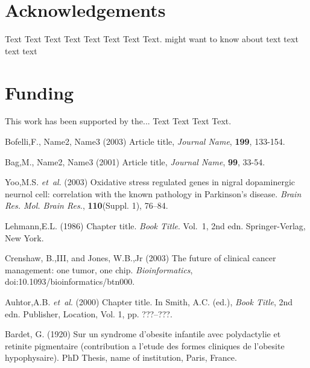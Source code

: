 \documentclass{bioinfo}
\begin{document}
\section*{Acknowledgements}

Text Text Text Text Text Text  Text Text.  \citealp{Boffelli03} might want to know about  text
text text text\vspace*{-12pt}

\section*{Funding}

This work has been supported by the... Text Text  Text Text.\vspace*{-12pt}

%
%
%
%
%
%
%
%
%


\begin{thebibliography}{}

Bofelli,F., Name2, Name3 (2003) Article title, {\it Journal Name}, {\bf 199}, 133-154.

Bag,M., Name2, Name3 (2001) Article title, {\it Journal Name}, {\bf 99}, 33-54.

Yoo,M.S. \textit{et~al}. (2003) Oxidative stress regulated genes
in nigral dopaminergic neurnol cell: correlation with the known
pathology in Parkinson's disease. \textit{Brain Res. Mol. Brain
Res.}, \textbf{110}(Suppl. 1), 76--84.

Lehmann,E.L. (1986) Chapter title. \textit{Book Title}. Vol.~1, 2nd edn. Springer-Verlag, New York.

Crenshaw, B.,III, and Jones, W.B.,Jr (2003) The future of clinical
cancer management: one tumor, one chip. \textit{Bioinformatics},
doi:10.1093/bioinformatics/btn000.

Auhtor,A.B. \textit{et~al}. (2000) Chapter title. In Smith, A.C.
(ed.), \textit{Book Title}, 2nd edn. Publisher, Location, Vol. 1, pp.
???--???.

Bardet, G. (1920) Sur un syndrome d'obesite infantile avec
polydactylie et retinite pigmentaire (contribution a l'etude des
formes cliniques de l'obesite hypophysaire). PhD Thesis, name of
institution, Paris, France.

\end{thebibliography}
\end{document}
